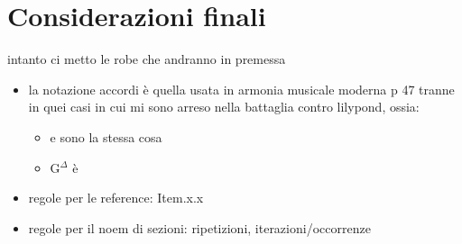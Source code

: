 \documentclass[class=book, crop=false, oneside, 12pt]{standalone}
\begin{document}
\chapter*{Considerazioni finali}

intanto ci metto le robe che andranno in premessa

\begin{itemize}
    \item la notazione accordi è quella usata in armonia musicale moderna p 47 tranne in quei casi in cui mi sono arreso nella battaglia contro lilypond, ossia:
    \begin{itemize}
        \item {} e  sono la stessa cosa
        \item G\(^\Delta\) è 
    \end{itemize}
    \item regole per le reference: Item.x.x
    \item regole per il noem di sezioni: ripetizioni, iterazioni/occorrenze
\end{itemize}
\end{document}

